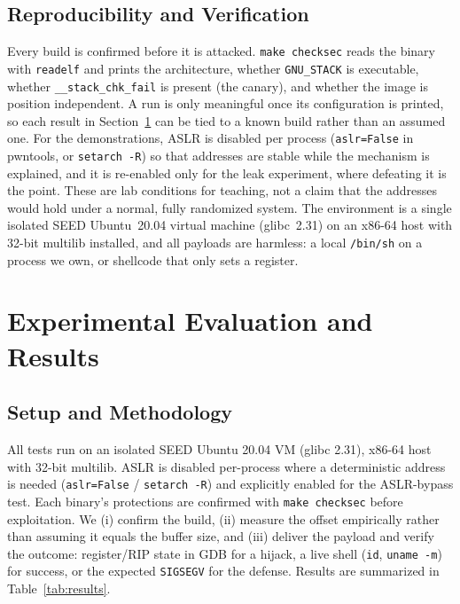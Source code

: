 \documentclass[10pt,twocolumn,letterpaper]{article}
\newcommand{\code}[1]{\texttt{\small #1}}
\begin{document}
\subsection{Reproducibility and Verification}
Every build is confirmed before it is attacked. \code{make checksec} reads the
binary with \code{readelf} and prints the architecture, whether
\code{GNU\_STACK} is executable, whether \code{\_\_stack\_chk\_fail} is present
(the canary), and whether the image is position independent. A run is only
meaningful once its configuration is printed, so each result in
Section~\ref{sec:results} can be tied to a known build rather than an assumed
one. For the demonstrations, ASLR is disabled per process (\code{aslr=False} in
pwntools, or \code{setarch -R}) so that addresses are stable while the mechanism
is explained, and it is re-enabled only for the leak experiment, where defeating
it is the point. These are lab conditions for teaching, not a claim that the
addresses would hold under a normal, fully randomized system. The environment is
a single isolated SEED Ubuntu~20.04 virtual machine (glibc~2.31) on an x86-64
host with 32-bit multilib installed, and all payloads are harmless: a local
\code{/bin/sh} on a process we own, or shellcode that only sets a register.

\section{Experimental Evaluation and Results}
\label{sec:results}

\subsection{Setup and Methodology}
All tests run on an isolated SEED Ubuntu 20.04 VM (glibc 2.31), x86-64 host with
32-bit multilib. ASLR is disabled per-process where a deterministic address is
needed (\code{aslr=False} / \code{setarch -R}) and explicitly enabled for the
ASLR-bypass test. Each binary's protections are confirmed with
\code{make checksec} before exploitation. We (i) confirm the build, (ii) measure
the offset empirically rather than assuming it equals the buffer size, and (iii)
deliver the payload and verify the outcome: register/RIP state in GDB for a
hijack, a live shell (\code{id}, \code{uname -m}) for success, or the expected
\code{SIGSEGV} for the defense. Results are summarized in
Table~\ref{tab:results}.
\end{document}
